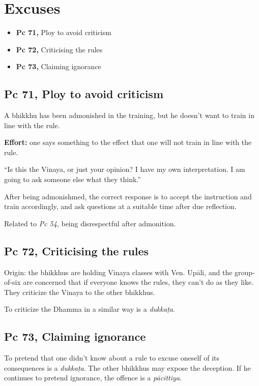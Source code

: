 \chapter{Excuses}

\begin{itemize}
\tightlist
\item
  \textbf{Pc 71,} Ploy to avoid criticism
\item
  \textbf{Pc 72,} Criticising the rules
\item
  \textbf{Pc 73,} Claiming ignorance
\end{itemize}

\section{Pc 71, Ploy to avoid criticism}

A bhikkhu has been admonished in the training, but he doesn't want to
train in line with the rule.

\textbf{Effort:} one says something to the effect that one will not
train in line with the rule.

``Is this the Vinaya, or just your opinion? I have my own
interpretation. I am going to ask someone else what they think.''

After being admonishmed, the correct response is to accept the
instruction and train accordingly, and ask questions at a suitable time
after due reflection.

Related to \emph{Pc 54}, being disrespectful after admonition.

\section{Pc 72, Criticising the rules}

Origin: the bhikkhus are holding Vinaya classes with Ven. Upāli, and the
group-of-six are concerned that if everyone knows the rules, they can't
do as they like. They criticize the Vinaya to the other bhikkhus.

To criticize the Dhamma in a similar way is a \emph{dukkaṭa}.

\section{Pc 73, Claiming ignorance}

To pretend that one didn't know about a rule to excuse oneself of its
consequences is a \emph{dukkaṭa}. The other bhikkhus may expose the
deception. If he continues to pretend ignorance, the offence is a
\emph{pācittiya}.

